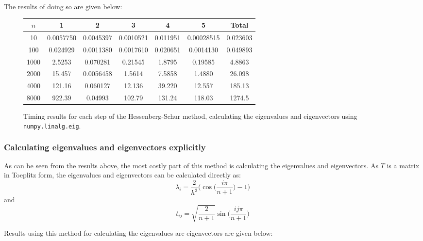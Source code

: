 \documentclass{article}
\numberwithin{equation}{section}
\begin{document}
The results of doing so are given below:

\begin{figure}
\begin{table}[H]
\centering
\begin{tabular}{|c|c|c|c|c|c|c|}
\hline
$n$ & 1 & 2 & 3 & 4 & 5 & Total \\
\hline
10 & 0.0057750 & 0.0045397 & 0.0010521 & 0.011951 & 0.00028515 & 0.023603 \\
100 & 0.024929 & 0.0011380 & 0.0017610 & 0.020651 & 0.0014130 & 0.049893 \\
1000 & 2.5253 & 0.070281 & 0.21545 & 1.8795 & 0.19585 & 4.8863 \\
2000 & 15.457 & 0.0056458 & 1.5614 & 7.5858 & 1.4880 & 26.098 \\
4000 & 121.16 & 0.060127 & 12.136 & 39.220 & 12.557 & 185.13 \\
8000 & 922.39 & 0.04993 & 102.79 & 131.24 & 118.03 & 1274.5  \\
\hline
\end{tabular}
\end{table}
\caption{Timing results for each step of the Hessenberg-Schur method, calculating the eigenvalues and eigenvectors using \texttt{numpy.linalg.eig}.}
\end{figure}

\subsubsection*{Calculating eigenvalues and eigenvectors explicitly}

As can be seen from the results above, the most costly part of this method is calculating the eigenvalues and eigenvectors. As $T$ is a matrix in Toeplitz form, the eigenvalues and eigenvectors can be calculated directly as:
\[ \lambda_i = \frac{2}{h^2} \Big( \cos \Big( \frac{i \pi}{n+1} \Big) - 1 \Big) \]
and 
\[ t_{ij} = \sqrt{\frac{2}{n+1}} \sin \Big( \frac{ij \pi}{n+1}  \Big) \]

Results using this method for calculating the eigenvalues are eigenvectors are given below:
\end{document}
